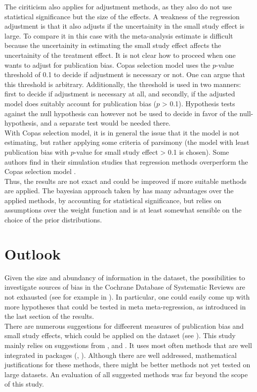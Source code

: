\documentclass[11pt,a4paper,twoside]{book}\usepackage[]{graphicx}\usepackage[]{color}
\begin{document}
The ciriticism also applies for adjustment methods, as they also do not use statistical significance but the size of the effects. A weakness of the regression adjustment is that it also adjusts if the uncertainity in the small study effect is large. To compare it in this case with the meta-analysis estimate is difficult because the uncertainity in estimating the small study effect affects the uncertainity of the treatment effect. It is not clear how to proceed when one wants to adjust for publication bias. Copas selection model uses the $p$-value threshold of 0.1 to decide if adjustment is necessary or not. One can argue that this threshold is arbitrary. Additionally, the threshold is used in two manners: first to decide if adjustment is necessary at all, and secondly, if the adjusted model does suitably account for publication bias ($p$ > 0.1). Hypothesis tests against the null hypothesis can however not be used to decide in favor of the null-hypothesis, and a separate test would be needed there. \\
With Copas selection model, it is in general the issue that it the model is not estimating, but rather applying some criteria of parsimony (the model with least publication bias with $p$-value for small study effect > 0.1 is chosen). Some authors find in their simulation studies that regression methods overperform the Copas selection model \citep{limitmeta}. \\
Thus, the results are not exact and could be improved if more suitable methods are applied. The bayesian approach taken by \citet{kicinsky} has many advantages over the applied methods, \eg by accounting for statistical significance, but relies on assumptions over the weight function and is at least somewhat sensible on the choice of the prior distributions. \\

\section{Outlook}
Given the size and abundancy of information in the dataset, the possibilities to investigate sources of bias in the Cochrane Database of Systematic Reviews are not exhausted (see for example in \citet{ioannidis.2017}). In particular, one could easily come up with more hypotheses that could be tested in meta meta-regression, as introduced in the last section of the results. \\
There are numerous suggestions for diffeerent measures of publication bias and small study effects, which could be applied on the dataset (see \citet{mueller.2016}). This study mainly relies on suggestions from \citet{Sterne}, \citet{Ioannidis2007} and \citet{limitmeta}. It uses most often methods that are well integrated in packages (\citet{metafor.package}, \citet{meta.package}). Although there are well addressed, mathematical justifications for these methods, there might be better methods not yet tested on large datasets. An evaluation of all suggested methods was far beyond the scope of this study.
\end{document}
